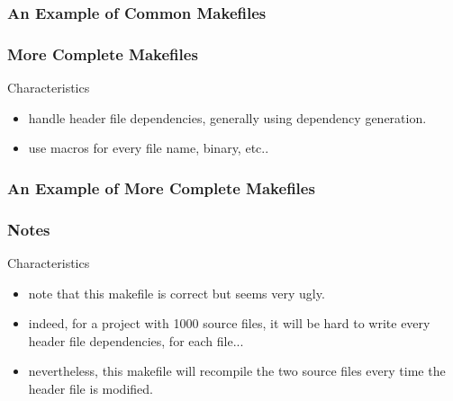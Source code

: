 \documentclass{beamer}
\begin{document}

\begin{frame}
  \frametitle{An Example of Common Makefiles}

  \begin{Example}
    
  \end{Example}

\end{frame}


\begin{frame}
  \frametitle{More Complete Makefiles}

  \begin{block}{Characteristics}
    \begin{itemize}
      \item
        handle header file dependencies, generally using dependency generation.
      \item
        use macros for every file name, binary, etc..
    \end{itemize}
  \end{block}

\end{frame}


\begin{frame}
  \frametitle{An Example of More Complete Makefiles}

  \begin{Example}
    
  \end{Example}

\end{frame}


\begin{frame}
  \frametitle{Notes}

  \begin{block}{Characteristics}
    \begin{itemize}
      \item
        note that this makefile is correct but seems very \alert{ugly}.
      \item
        indeed, for a project with 1000 source files, it will be hard to
        write every header file dependencies, for each file...
      \item
        nevertheless, this makefile will recompile the two source files
        every time the header file is modified.
    \end{itemize}
  \end{block}

\end{frame}
\end{document}
